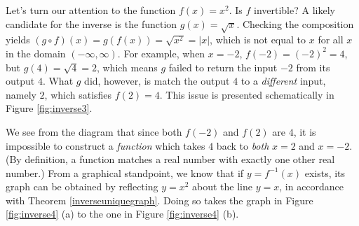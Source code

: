 \smallskip







 \label{inversefunctionuniqueness}

\smallskip




\smallskip

Let's turn our attention to the function $f(x) = x^2$.  Is $f$ invertible?  A likely candidate for the inverse is the function $g(x) = \sqrt{x}$.  Checking the composition yields $(g\circ f)(x) = g(f(x)) = \sqrt{x^2} = |x|$, which is not equal to $x$ for all $x$ in the domain $(-\infty, \infty)$.  For example, when $x=-2$,  $f(-2)= (-2)^2 = 4$, but $g(4) = \sqrt{4}=2$, which means $g$ failed to return the input $-2$ from its output $4$.  What $g$ did, however, is match the output $4$ to a \textit{different} input, namely $2$, which satisfies $f(2) = 4$.  This issue is presented schematically in Figure \ref{fig:inverse3}.




We see from the diagram that since both $f(-2)$ and $f(2)$ are $4$, it is impossible to construct a \textit{function} which takes $4$ back to \textit{both} $x=2$ and $x=-2$. (By definition, a function matches a real number with exactly one other real number.)  From a graphical standpoint, we know that if $y=f^{-1}(x)$ exists, its graph can be obtained by reflecting $y=x^2$ about the line $y=x$, in accordance with Theorem \ref{inverseuniquegraph}.  Doing so takes the graph in Figure \ref{fig:inverse4} (a) to the one in Figure \ref{fig:inverse4} (b).

